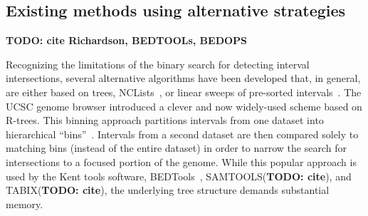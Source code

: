 \documentclass{bioinfo}
\begin{document}
	

	\subsection{Existing methods using alternative strategies}

	\textbf{TODO: cite Richardson, BEDTOOLs, BEDOPS}

	Recognizing the limitations of the binary search for detecting interval intersections, several alternative algorithms 
	have been developed that, in general, are either based on trees, NCLists~\citep{alekseyenko2007}, or linear sweeps of 
	pre-sorted intervals~\citep{richardson2006}. The UCSC genome browser introduced a clever and now widely-used 
	scheme based on R-trees. This binning approach partitions intervals from one dataset into hierarchical ``bins''~\citep{kent2002}.  
	Intervals from a second dataset are then compared solely to matching bins (instead of the 
	entire dataset) in order to narrow the search for intersections to a focused portion of the genome.  
	While this popular approach is used by the Kent tools software, BEDTools~\citep{quinlan2010}, 
	SAMTOOLS(\textbf{TODO: cite}), and TABIX(\textbf{TODO: cite}), the underlying tree structure 
	demands substantial memory. 


\end{document}
